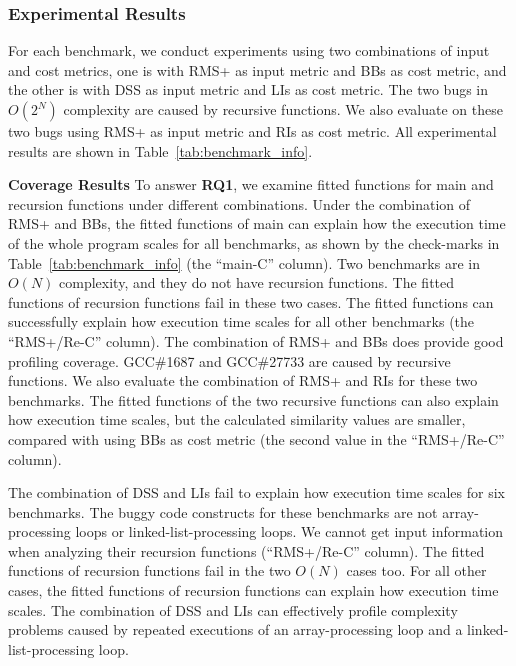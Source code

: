 \subsubsection{Experimental Results} 
For each benchmark, we conduct experiments using two 
combinations of input and cost metrics, one is with 
RMS+ as input metric and BBs as cost metric, 
and the other is with DSS as input metric and LIs as cost metric. 
The two bugs in $O(2^N)$ complexity are caused by recursive functions.
We also evaluate \Tool on these two bugs 
using RMS+ as input metric and RIs as cost metric. 
All experimental results are shown in Table~\ref{tab:benchmark_info}.


\textbf{Coverage Results}
To answer {\bf RQ1}, 
we examine fitted functions for main and recursion functions 
under different combinations. 
Under the combination of RMS+ and BBs, 
the fitted functions of main can explain 
how the execution time of the whole program scales for all benchmarks, 
as shown by the check-marks 
in Table~\ref{tab:benchmark_info} (the ``main-C'' column).
Two benchmarks are in $O(N)$ complexity, and they do not have recursion functions.
The fitted functions of recursion functions fail in these two cases. 
The fitted functions can successfully 
explain how execution time scales for all other benchmarks (the ``RMS+/Re-C'' column).
The combination of RMS+ and BBs does provide good profiling coverage. 
GCC\#1687 and GCC\#27733 are caused by recursive functions. 
We also evaluate the combination of RMS+ and RIs for these two benchmarks.
The fitted functions of the two recursive functions can also explain how execution time scales, 
but the calculated similarity values are smaller, 
compared with using BBs as cost metric 
(the second value in the ``RMS+/Re-C'' column). 

The combination of DSS and LIs fail to explain how execution time scales for six benchmarks.
The buggy code constructs for these benchmarks 
are not array-processing loops or linked-list-processing loops. 
We cannot get input information 
when analyzing their recursion functions 
(``RMS+/Re-C'' column).  
The fitted functions of recursion functions fail in the two $O(N)$ cases too.
For all other cases, the fitted functions of recursion functions can 
explain how execution time scales. 
The combination of DSS and LIs can effectively 
profile complexity problems caused by 
repeated executions of an array-processing loop 
and a linked-list-processing loop. 


